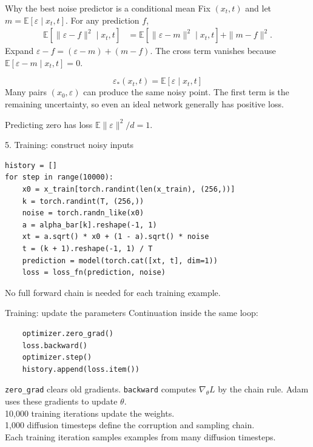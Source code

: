 \documentclass[aspectratio=169,11pt]{beamer}
\begin{document}
\begin{frame}{Why the best noise predictor is a conditional mean}
Fix $(x_t,t)$ and let $m=\mathbb E[\varepsilon\mid x_t,t]$. For any prediction $f$,
\begin{align*}
\mathbb E[\|\varepsilon-f\|^2\mid x_t,t]
&=\mathbb E[\|\varepsilon-m\|^2\mid x_t,t]+\|m-f\|^2.
\end{align*}
Expand $\varepsilon-f=(\varepsilon-m)+(m-f)$. The cross term vanishes because $\mathbb E[\varepsilon-m\mid x_t,t]=0$.
\par\vspace{3mm}
\[\boxed{\varepsilon_*(x_t,t)=\mathbb E[\varepsilon\mid x_t,t]}\]
Many pairs $(x_0,\varepsilon)$ can produce the same noisy point. The first term is the remaining uncertainty, so even an ideal network generally has positive loss.
\par\vspace{2mm}
Predicting zero has loss $\mathbb E\|\varepsilon\|^2/d=1$.
\end{frame}

\begin{frame}[fragile]{5. Training: construct noisy inputs}
\begin{lstlisting}[basicstyle=\ttfamily\footnotesize]
history = []
for step in range(10000):
    x0 = x_train[torch.randint(len(x_train), (256,))]
    k = torch.randint(T, (256,))
    noise = torch.randn_like(x0)
    a = alpha_bar[k].reshape(-1, 1)
    xt = a.sqrt() * x0 + (1 - a).sqrt() * noise
    t = (k + 1).reshape(-1, 1) / T
    prediction = model(torch.cat([xt, t], dim=1))
    loss = loss_fn(prediction, noise)
\end{lstlisting}
\par\vspace{3mm}
No full forward chain is needed for each training example.
\end{frame}

\begin{frame}[fragile]{Training: update the parameters}
Continuation inside the same loop:
\begin{lstlisting}
    optimizer.zero_grad()
    loss.backward()
    optimizer.step()
    history.append(loss.item())
\end{lstlisting}
\par\vspace{4mm}
\small
\texttt{zero\_grad} clears old gradients. \texttt{backward} computes $\nabla_\theta L$ by the chain rule. Adam uses these gradients to update $\theta$.\\[3mm]
10,000 \alert{training iterations} update the weights.\\[3mm]
1,000 \alert{diffusion timesteps} define the corruption and sampling chain.\\[3mm]
Each training iteration samples examples from many diffusion timesteps.
\end{frame}
\end{document}
